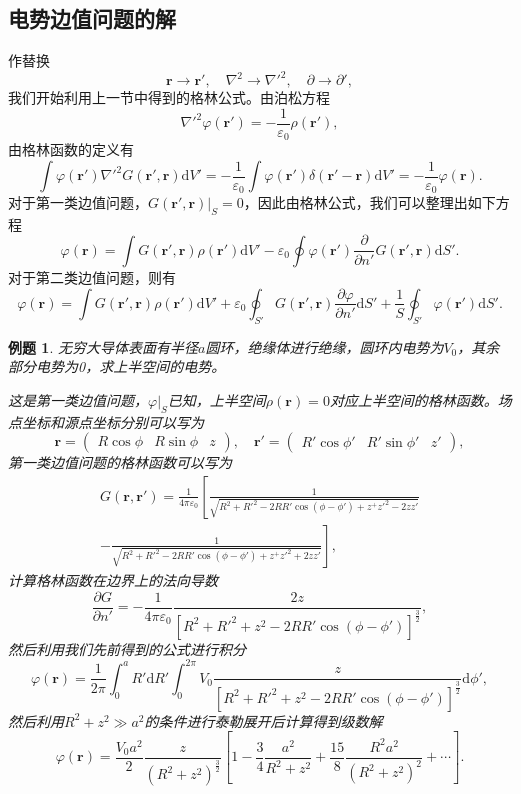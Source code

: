 \documentclass[UTF8]{ctexbook}
\renewcommand{\d}{\mathrm{d}}
\renewcommand{\b}{\boldsymbol}
\renewcommand{\k}{\frac{1}{4\pi\varepsilon_0}}
\newtheorem{eg}{例题}
\numberwithin{equation}{chapter}
\begin{document}
	\subsection{电势边值问题的解}
	作替换
	\[\b{r}\rightarrow \b{r}',\quad \nabla^2\rightarrow \nabla'^2,\quad \partial \rightarrow \partial',\]
	我们开始利用上一节中得到的格林公式。由泊松方程
	\[\nabla'^2\varphi(\b{r}')=-\frac{1}{\varepsilon_0}\rho(\b{r}'),\]
	由格林函数的定义有
	\[\int \varphi(\b{r}')\nabla'^2 G(\b{r}',\b{r})\d V'=-\frac{1}{\varepsilon_0}\int\varphi(\b{r}')\delta(\b{r}'-\b{r})\d V'=-\frac{1}{\varepsilon_0}\varphi(\b{r}).\]
	对于第一类边值问题，$G(\b{r}',\b{r})|_S=0$，因此由格林公式，我们可以整理出如下方程
	\[\varphi(\b{r})=\int G(\b{r}',\b{r})\rho(\b{r}')\d V' - \varepsilon_0\oint \varphi(\b{r}')\frac{\partial }{\partial n'}G(\b{r}',\b{r})\d S'.\]
	对于第二类边值问题，则有
	\[\varphi(\b{r})=\int G(\b{r}',\b{r})\rho(\b{r}')\d V'+\varepsilon_0\oint_{S'}G(\b{r}',\b{r})\frac{\partial \varphi}{\partial n'}\d S'+\frac{1}{S}\oint_{S'}\varphi(\b{r}')\d S'.\]
	\begin{eg}
		无穷大导体表面有半径$a$圆环，绝缘体进行绝缘，圆环内电势为$V_0$，其余部分电势为0，求上半空间的电势。
		\begin{figure}[H]
			\centering
		\end{figure}
		这是第一类边值问题，$\varphi|_S$已知，上半空间$\rho(\b{r})=0$对应上半空间的格林函数。场点坐标和源点坐标分别可以写为
		\[\b{r}=\begin{pmatrix} R\cos\phi& R\sin\phi &z\end{pmatrix},\quad \b{r}'= \begin{pmatrix} R'\cos\phi' & R'\sin\phi' & z'\end{pmatrix},\]
		第一类边值问题的格林函数可以写为
		\begin{multline*}
			G(\b{r},\b{r}')=\k \left[\frac{1}{\sqrt{R^2+R'^2-2RR'\cos(\phi-\phi')+z^+z'^2-2zz'}}\right. \\ -\left.\frac{1}{\sqrt{R^2+R'^2-2RR'\cos(\phi-\phi')+z^+z'^2+2zz'}}\right],
		\end{multline*}
		计算格林函数在边界上的法向导数
		\[\frac{\partial G}{\partial n'}=-\k\frac{2z}{[R^2+R'^2+z^2-2RR'\cos(\phi-\phi')]^{\frac{3}{2}}},\]
		然后利用我们先前得到的公式进行积分
		\[\varphi(\b{r})=\frac{1}{2\pi}\int_0^a R'\d R'\int_0^{2\pi}V_0\frac{z}{[R^2+R'^2+z^2-2RR'\cos(\phi-\phi')]^{\frac{3}{2}}}\d \phi',\]
		然后利用$R^2+z^2 \gg a^2$的条件进行泰勒展开后计算得到级数解
		\[\varphi(\b{r})=\frac{V_0 a^2}{2}\frac{z}{(R^2+z^2)^{\frac{3}{2}}} \left[ 1-\frac{3}{4}\frac{a^2}{R^2+z^2}+\frac{15}{8}\frac{R^2a^2}{(R^2+z^2)^2}+\cdots\right].\]
		
	\end{eg}
	
\end{document}
